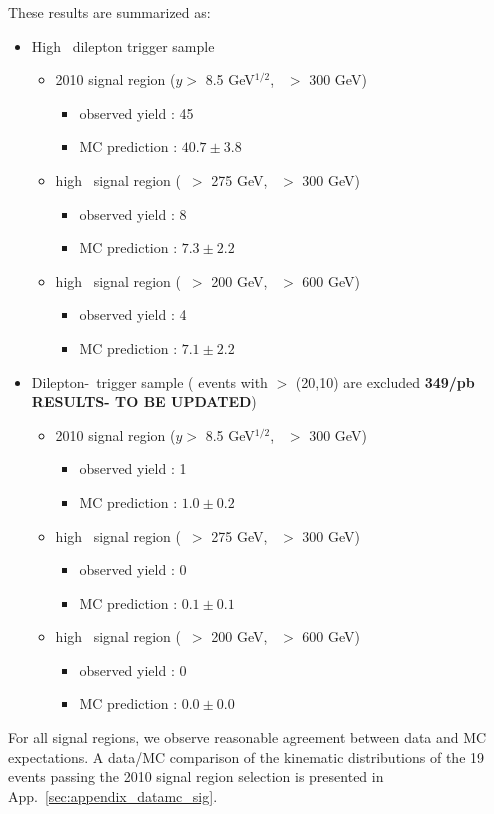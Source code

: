 These results are summarized as:

\begin{itemize}
\item High \pt\ dilepton trigger sample
\begin{itemize}
\item 2010 signal region ($y >$ 8.5 GeV$^{1/2}$, \Ht\ $>$ 300 GeV)
   \begin{itemize} 
   \item observed yield : 45 
   \item MC prediction  : $40.7 \pm 3.8$
   \end{itemize}  
\item high \met\ signal region (\met\ $>$ 275 GeV, \Ht\ $>$ 300 GeV)
   \begin{itemize} 
   \item observed yield : 8 
   \item MC prediction  : $7.3 \pm 2.2$
   \end{itemize}  
\item high \Ht\ signal region (\met\ $>$ 200 GeV, \Ht\ $>$ 600 GeV)
   \begin{itemize} 
   \item observed yield : 4 
   \item MC prediction  : $7.1 \pm 2.2$
   \end{itemize}  
\end{itemize}

\item Dilepton-\Ht\ trigger sample ( events with \pt $>$ (20,10) are excluded {\bf 349/pb RESULTS- TO BE UPDATED})
\begin{itemize}
\item 2010 signal region ($y >$ 8.5 GeV$^{1/2}$, \Ht\ $>$ 300 GeV)
   \begin{itemize} 
   \item observed yield : 1 
   \item MC prediction  : $1.0 \pm 0.2$
   \end{itemize}  
\item high \met\ signal region (\met\ $>$ 275 GeV, \Ht\ $>$ 300 GeV)
   \begin{itemize} 
   \item observed yield : 0 
   \item MC prediction  : $0.1 \pm 0.1$
   \end{itemize}  
\item high \Ht\ signal region (\met\ $>$ 200 GeV, \Ht\ $>$ 600 GeV)
   \begin{itemize} 
   \item observed yield : 0 
   \item MC prediction  : $0.0 \pm 0.0$
   \end{itemize}  
\end{itemize}
\end{itemize}

For all signal regions, we observe reasonable agreement between data and MC expectations. 
A data/MC comparison of the kinematic distributions of the 19 events passing
the 2010 signal region selection is presented in App.~\ref{sec:appendix_datamc_sig}.

